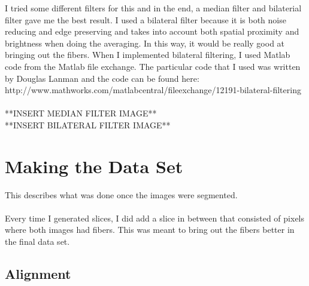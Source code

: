 \documentclass[11pt,psfig]{article}
\begin{document}
I tried some different filters for this and in the end, a median filter and bilaterial filter gave me the best result. I used a bilateral filter because it is both noise reducing and edge preserving and takes into account both spatial proximity and brightness when doing the averaging. In this way, it would be really good at bringing out the fibers. When I implemented bilateral filtering, I used Matlab code from the Matlab file exchange. The particular code that I used was written by Douglas Lanman and the code can be found here: http://www.mathworks.com/matlabcentral/fileexchange/12191-bilateral-filtering \\
\\
**INSERT MEDIAN FILTER IMAGE**
\\
**INSERT BILATERAL FILTER IMAGE**

\section{Making the Data Set}

This describes what was done once the images were segmented. \\
\\
Every time I generated slices, I did add a slice in between that consisted of pixels where both images had fibers. This was meant to bring out the fibers better in the final data set. 

\subsection{Alignment}
\end{document}
